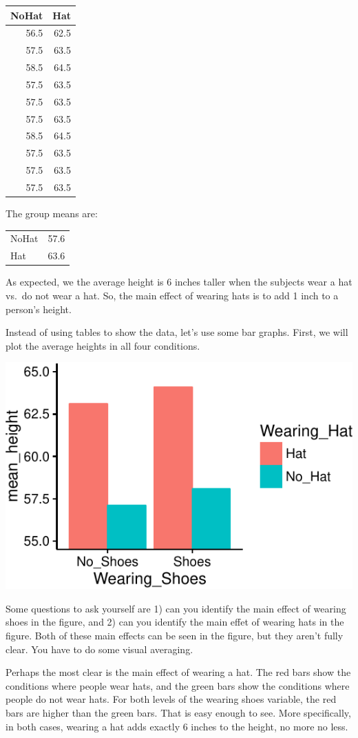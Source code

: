 \begin{longtable}[]{@{}rr@{}}
\toprule
NoHat & Hat\tabularnewline
\midrule
\endhead
56.5 & 62.5\tabularnewline
57.5 & 63.5\tabularnewline
58.5 & 64.5\tabularnewline
57.5 & 63.5\tabularnewline
57.5 & 63.5\tabularnewline
57.5 & 63.5\tabularnewline
58.5 & 64.5\tabularnewline
57.5 & 63.5\tabularnewline
57.5 & 63.5\tabularnewline
57.5 & 63.5\tabularnewline
\bottomrule
\end{longtable}

The group means are:

\begin{longtable}[]{@{}lr@{}}
\toprule
NoHat & 57.6\tabularnewline
Hat & 63.6\tabularnewline
\bottomrule
\end{longtable}

As expected, we the average height is 6 inches taller when the subjects
wear a hat vs.~do not wear a hat. So, the main effect of wearing hats is
to add 1 inch to a person's height.

Instead of using tables to show the data, let's use some bar graphs.
First, we will plot the average heights in all four conditions.

\includegraphics{Factorial_files/figure-latex/unnamed-chunk-7-1}

Some questions to ask yourself are 1) can you identify the main effect
of wearing shoes in the figure, and 2) can you identify the main effet
of wearing hats in the figure. Both of these main effects can be seen in
the figure, but they aren't fully clear. You have to do some visual
averaging.

Perhaps the most clear is the main effect of wearing a hat. The red bars
show the conditions where people wear hats, and the green bars show the
conditions where people do not wear hats. For both levels of the wearing
shoes variable, the red bars are higher than the green bars. That is
easy enough to see. More specifically, in both cases, wearing a hat adds
exactly 6 inches to the height, no more no less.

